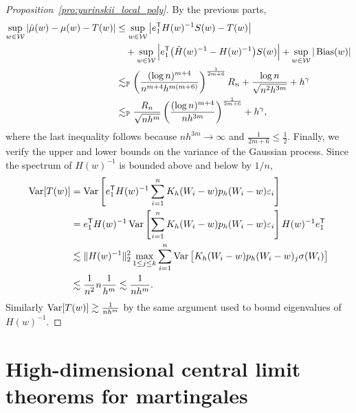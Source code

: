 \begin{proof}[Proposition~\ref{pro:yurinskii_local_poly}]

  By the previous parts,
  \begin{align*}
    \sup_{w \in \mathcal{W}}
    \left|\hat \mu(w) - \mu(w) - T(w) \right|
    &\leq
    \sup_{w \in \mathcal{W}}
    \left|e_1^{\mathsf{T}} H(w)^{-1} S(w) - T(w) \right| \\
    &\quad+
    \sup_{w \in \mathcal{W}}
    \left| e_1^{\mathsf{T}} \big(\hat H(w)^{-1} - H(w)^{-1}\big) S(w) \right|
    + \sup_{w \in \mathcal{W}}
    |\operatorname{Bias}(w)| \\
    &\lesssim_{\mathbb{P}}
    \left(
      \frac{(\log n)^{m+4}}{n^{m+4}h^{m(m+6)}}
    \right)^{\frac{1}{2m+6}} R_n
    + \frac{\log n}{\sqrt{n^2 h^{3m}}}
    + h^\gamma \\
    &\lesssim_{\mathbb{P}}
    \frac{R_n}{\sqrt{n h^m}}
    \left(
      \frac{(\log n)^{m+4}}{n h^{3m}}
    \right)^{\frac{1}{2m+6}}
    + h^\gamma,
  \end{align*}
  where the last inequality follows because
  $n h^{3m} \to \infty$
  and $\frac{1}{2m+6} \leq \frac{1}{2}$.
  Finally, we verify the upper and lower bounds
  on the variance of the Gaussian process.
  Since the spectrum of $H(w)^{-1}$
  is bounded above and below by $1/n$,
  \begin{align*}
    \operatorname{Var}[T(w)]
    &=
    \operatorname{Var}\left[
      e_1^{\mathsf{T}} H(w)^{-1}
      \sum_{i=1}^n K_h(W_i-w) p_h(W_i-w) \varepsilon_i
    \right] \\
    &=
    e_1^{\mathsf{T}} H(w)^{-1}
    \operatorname{Var}\left[
      \sum_{i=1}^n K_h(W_i-w) p_h(W_i-w) \varepsilon_i
    \right]
    H(w)^{-1} e_1^{\mathsf{T}} \\
    &\lesssim
    \|H(w)^{-1}\|_2^2
    \max_{1 \leq j \leq k}
    \sum_{i=1}^n
    \operatorname{Var}\big[
      K_h(W_i-w) p_h(W_i-w)_j \sigma(W_i)
    \big] \\
    &\lesssim
    \frac{1}{n^2} n
    \frac{1}{h^m}
    \lesssim
    \frac{1}{n h^m}.
  \end{align*}
  Similarly
  $\operatorname{Var}[T(w)] \gtrsim \frac{1}{n h^m}$
  by the same argument used to bound eigenvalues of
  $H(w)^{-1}$.
\end{proof}

\section{High-dimensional central limit theorems for martingales}%
\label{sec:yurinskii_app_high_dim_clt}

